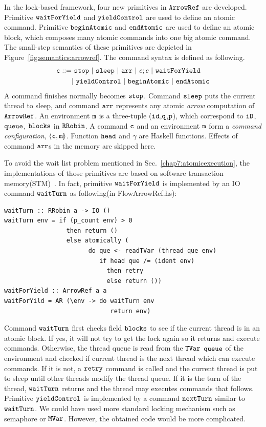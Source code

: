 \documentclass[a4paper]{report}
\newcommand{\co}[1]{$\cod{#1}$}
\begin{document}
In the lock-based framework, four new primitives in \co{ArrowRef} are developed. 
Primitive \co{waitForYield} and \co{yieldControl} are used to define an atomic command.
Primitive \co{beginAtomic} and \co{endAtomic} are used to define an atomic block, which
composes many atomic commands into one big atomic command.
The small-step semantics of these primitives are depicted 
in Figure~\ref{fig:semantics:arrowref}.
The command syntax is defined as following.
\begin{align*}
\cod{c}::=&~\cod{stop}~|~\cod{sleep}~|~\cod{arr}~|~c;c~|~\cod{waitForYield} \\
          &|~\cod{yieldControl}~|~\cod{beginAtomic}~|~\cod{endAtomic}
\label{chap7:commandsyntax}
\end{align*}
A command finishes normally becomes \co{stop}.
Command \co{sleep} puts the current thread to sleep, and command \co{arr} represents any atomic {\em arrow}
computation of \co{ArrowRef}. An environment \co{m}
is a three-tuple (\co{id},\co{q},\co{p}), which correspond to \co{iD}, \co{queue},
\co{blocks} in \co{RRobin}. A command \co{c} and an environment \co{m} form a 
{\em command configuration}, $\langle\hspace{-2.4 pt}| \mathtt{c},\mathtt{m} |\hspace{-2.4 pt}\rangle$. Function \co{head} and $\gamma$ are
Haskell functions. Effects of command \co{arr}s in the memory are skipped here.

To avoid the wait list problem mentioned in Sec.~\ref{chap7:atomicexecution}, the implementations of
those primitives are based on software transaction memory(STM)~\cite{Harris:Marlow:Jones:Herlihy:PPoPP05}. 
In fact, primitive \co{waitForYield} is implemented by an IO command \co{waitTurn} 
as following(in FlowArrowRef.hs):
\begin{Verbatim}[fontsize=\footnotesize]
waitTurn :: RRobin a -> IO ()
waitTurn env = if (p_count env) > 0
                 then return ()
                 else atomically (
                       do que <- readTVar (thread_que env)
                          if head que /= (ident env)
                            then retry
                            else return ())
waitForYield :: ArrowRef a a
waitForYild = AR (\env -> do waitTurn env
                             return env)
\end{Verbatim}
Command \co{waitTurn} first checks field \co{blocks} to see if the current thread is in an atomic block.
If yes, it will not try to get the lock again so it returns and execute commands.
Otherwise, the thread queue is read from the \co{TVar} \co{queue} of the environment and checked if 
current thread is the next thread which can execute commands. If it is not, a \co{retry} command is called
and the current thread is put to sleep until other threads modify the thread queue. If it is the 
turn of the thread, \co{waitTurn}
returns and the thread may executes commands that follows. Primitive \co{yieldControl} is implemented by a
command \co{nextTurn} similar to \co{waitTurn}.
We could have used more standard locking mechanism such as semaphore or \co{MVar}.
However, the obtained code would be more complicated.
\end{document}
